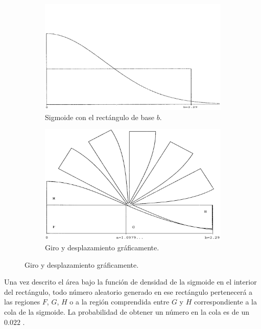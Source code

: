 \documentclass[a4paper,12pt]{article}
\begin{document}
	\begin{figure}[H]
		\begin{subfigure}{.5\textwidth}
			\centering
			\includegraphics[width=\textwidth]{include/sigmoid_w_square.png}
			\caption{Sigmoide con el rectángulo de base $b$. \cite{monty-python}}
		\end{subfigure}
		\begin{subfigure}{.5\textwidth}
			\centering
			\includegraphics[width=\textwidth]{include/rotating_sigmoid.png}
			\caption{Giro y desplazamiento gráficamente. \cite{monty-python}}
		\end{subfigure}
	\end{figure}
	
	Una vez descrito el área bajo la función de densidad de la sigmoide en el interior del rectángulo, todo número aleatorio generado en ese rectángulo pertenecerá a las regiones $F$, $G$, $H$ o a la región comprendida entre $G$ y $H$ correspondiente a la cola de la sigmoide. La probabilidad de obtener un número en la cola es de un $0.022$ \cite{monty-python}.
	
\end{document}
